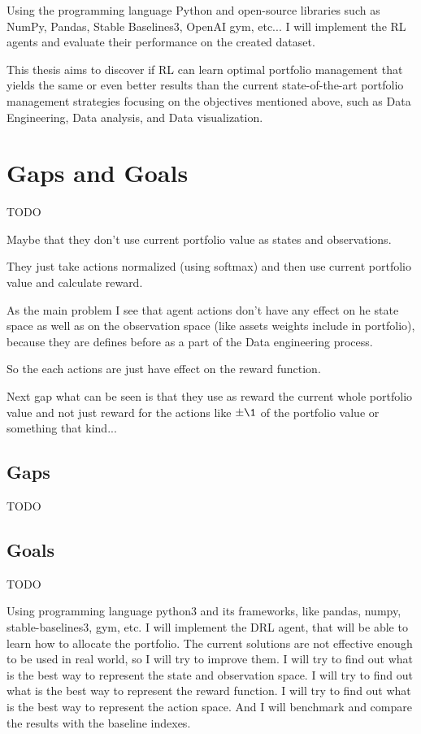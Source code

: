 Using the programming language Python and open-source libraries such as NumPy, Pandas, Stable Baselines3, OpenAI gym, etc... I will implement the RL agents and evaluate their performance on the created dataset.

This thesis aims to discover if RL can learn optimal portfolio management that yields the same or even better results than the current state-of-the-art portfolio management strategies focusing on the objectives mentioned above, such as Data Engineering, Data analysis, and Data visualization.



\chapter{Gaps and Goals}\label{ch:gaps-and-goals}
TODO

Maybe that they don't use current portfolio value as states and observations.

They just take actions normalized (using softmax) and then use current portfolio value
and calculate reward.

As the main problem I see that agent actions don't have any effect on he
state space as well as on the observation space (like assets weights include in portfolio),
because they are defines
before as a part of the Data engineering process.

So the each actions are just have effect on the reward function.

Next gap what can be seen is that they use as reward the current whole portfolio value
and not just reward for the actions like $\pm\1$ of the portfolio value or
something that kind...


\section{Gaps}\label{sec:gaps}
TODO


\section{Goals}\label{sec:goals}
TODO

Using programming language python3 and its frameworks, like pandas, numpy, stable-baselines3, gym, etc.
I will implement the DRL agent, that will be able to learn how to allocate the portfolio.
The current solutions are not effective enough to be used in real world, so I will try to improve them.
I will try to find out what is the best way to represent the state and observation space.
I will try to find out what is the best way to represent the reward function.
I will try to find out what is the best way to represent the action space.
And I will benchmark and compare the results with the baseline indexes.

